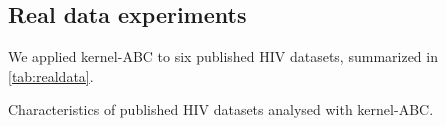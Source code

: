 \subsection{Real data experiments}

We applied kernel-ABC to six published HIV datasets, summarized in
\cref{tab:realdata}.

\begin{table}
  \centering
  
  \caption{Characteristics of published HIV datasets analysed with kernel-ABC.}
  \label{tab:realdata}
\end{table}
